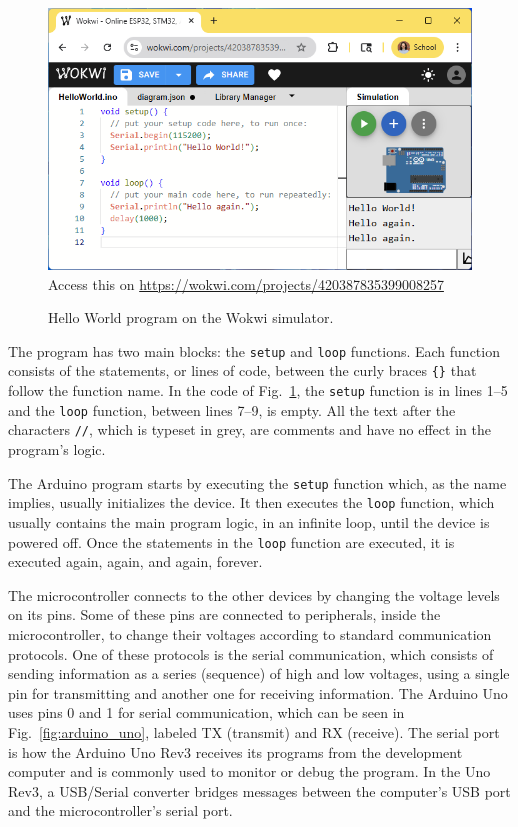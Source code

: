 \begin{figure}[t]
  \begin{wide}
    \includegraphics[width=\textwidth]{img/wokwi-hello.png}
    \\ \scriptsize
    Access this on \url{https://wokwi.com/projects/420387835399008257}
    \caption{Hello World program on the Wokwi simulator.}
    \label{fig:wokwi-hello}
  \end{wide}
\end{figure}

The program has two main blocks: the \texttt{setup} and \texttt{loop} functions.
Each function consists of the statements, or lines of code, between the curly braces \texttt{\{\}} that follow the function name.
In the code of Fig.~\ref{fig:wokwi-hello}, the \texttt{setup} function is in lines 1--5 and the \texttt{loop} function, between lines 7--9, is empty.
All the text after the characters \texttt{//}, which is typeset in grey, are comments and have no effect in the program's logic.

The Arduino program starts by executing the \texttt{setup} function which, as the name implies, usually initializes the device.
It then executes the \texttt{loop} function, which usually contains the main program logic, in an infinite loop, until the device is powered off.
Once the statements in the \texttt{loop} function are executed, it is executed again, again, and again, forever.

The microcontroller connects to the other devices by changing the voltage levels on its pins.
Some of these pins are connected to peripherals, inside the microcontroller, to change their voltages according to standard communication protocols.
One of these protocols is the serial communication, which consists of sending information as a series (sequence) of high and low voltages, using a single pin for transmitting and another one for receiving information.
The Arduino Uno uses pins 0 and 1 for serial communication, which can be seen in Fig.~\ref{fig:arduino_uno}, labeled TX (transmit) and RX (receive).
The serial port is how the Arduino Uno Rev3 receives its programs from the development computer and is commonly used to monitor or debug the program.
In the Uno Rev3, a USB/Serial converter bridges messages between the computer's USB port and the microcontroller's serial port.

